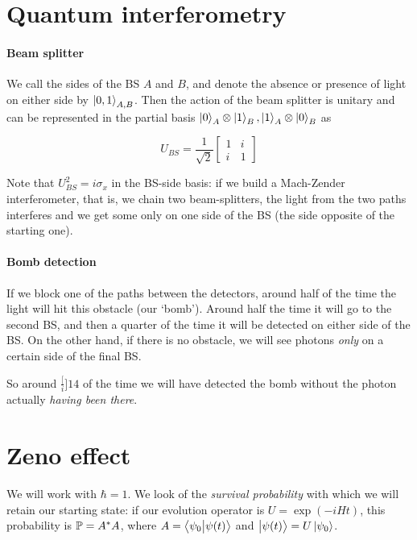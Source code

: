 \documentclass[main.tex]{subfiles}
\begin{document}
\section{Quantum interferometry}

\paragraph{Beam splitter}

We call the sides of the BS \(A\) and \(B\), and denote the absence or presence of light on either side by \(\ket{0,1} _{A, B}\). Then the action of the beam splitter is unitary and can be represented in the partial basis \(\ket{0}_A \otimes \ket{1} _B , \ket{1}_A \otimes \ket{0} _B\) as

\begin{equation}
    U_{BS} = \frac{1}{\sqrt{2} }
    \begin{bmatrix}
    1   & i \\
    i   & 1
\end{bmatrix}
\end{equation}

Note that \(U_{BS}^2 = i\sigma_x\) in the BS-side basis: if we build a Mach-Zender interferometer, that is, we chain two beam-splitters, the light from the two paths interferes and we get some only on one side of the BS (the side opposite of the starting one).

\paragraph{Bomb detection}

If we block one of the paths between the detectors, around half of the time the light will hit this obstacle (our `bomb'). Around half the time it will go to the second BS, and then a quarter of the time it will be detected on either side of the BS. On the other hand, if there is no obstacle, we will see photons \emph{only} on a certain side of the final BS.

So around \(\frac[i]{1}{4} \) of the time we will have detected the bomb without the photon actually \emph{having been there}.

\section{Zeno effect} \label{sec:zeno}

We will work with \(\hbar=1\).
We look of the \emph{survival probability} with which we will retain our starting state: if our evolution operator is \(U = \exp(-iHt) \), this probability is \(\P = A^*A\), where \(A = \braket{\psi_0}{\psi (t)} \) and \(\ket{\psi (t)} = U \ket{\psi _0} \).
\end{document}
